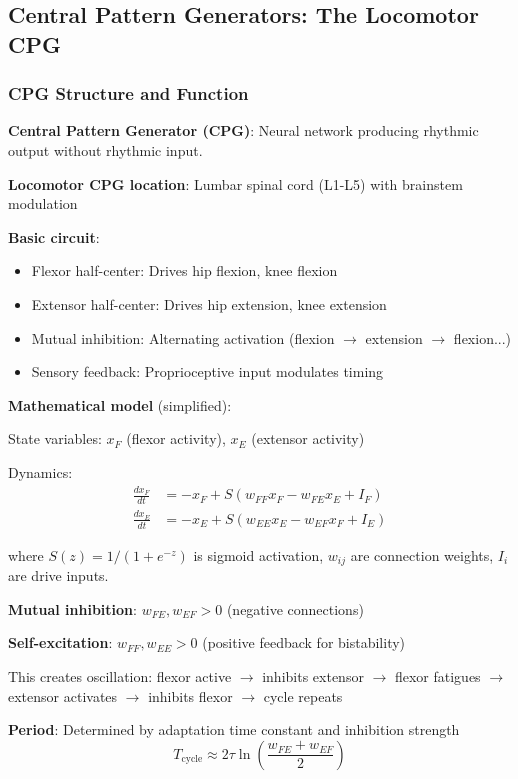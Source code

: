 \documentclass[11pt,onecolumn]{article}
\begin{document}
\subsection{Central Pattern Generators: The Locomotor CPG}

\subsubsection{CPG Structure and Function}

\textbf{Central Pattern Generator (CPG)}: Neural network producing rhythmic output without rhythmic input.

\textbf{Locomotor CPG location}: Lumbar spinal cord (L1-L5) with brainstem modulation

\textbf{Basic circuit}:
\begin{itemize}
\item Flexor half-center: Drives hip flexion, knee flexion
\item Extensor half-center: Drives hip extension, knee extension
\item Mutual inhibition: Alternating activation (flexion $\to$ extension $\to$ flexion...)
\item Sensory feedback: Proprioceptive input modulates timing
\end{itemize}

\textbf{Mathematical model} (simplified):

State variables: $x_F$ (flexor activity), $x_E$ (extensor activity)

Dynamics:
\begin{align}
\frac{dx_F}{dt} &= -x_F + S(w_{FF}x_F - w_{FE}x_E + I_F) \\
\frac{dx_E}{dt} &= -x_E + S(w_{EE}x_E - w_{EF}x_F + I_E)
\end{align}

where $S(z) = 1/(1 + e^{-z})$ is sigmoid activation, $w_{ij}$ are connection weights, $I_i$ are drive inputs.

\textbf{Mutual inhibition}: $w_{FE}, w_{EF} > 0$ (negative connections)

\textbf{Self-excitation}: $w_{FF}, w_{EE} > 0$ (positive feedback for bistability)

This creates oscillation: flexor active $\to$ inhibits extensor $\to$ flexor fatigues $\to$ extensor activates $\to$ inhibits flexor $\to$ cycle repeats

\textbf{Period}: Determined by adaptation time constant and inhibition strength
\begin{equation}
T_{\text{cycle}} \approx 2\tau \ln\left(\frac{w_{FE} + w_{EF}}{2}\right)
\end{equation}
\end{document}
